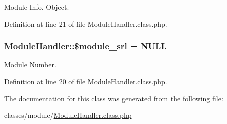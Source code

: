 Module Info. Object. 



Definition at line 21 of file Module\-Handler.\-class.\-php.

\hypertarget{classModuleHandler_ad79751537e64d7bfc7dc6fa4280043b0}{
\subsubsection[{\$module\-\_\-srl}]{\setlength{\rightskip}{0pt plus 5cm}Module\-Handler\-::\$module\-\_\-srl = N\-U\-L\-L}}\label{classModuleHandler_ad79751537e64d7bfc7dc6fa4280043b0}


Module Number. 



Definition at line 20 of file Module\-Handler.\-class.\-php.



The documentation for this class was generated from the following file\-:\begin{DoxyCompactItemize}
\item 
classes/module/\hyperlink{ModuleHandler_8class_8php}{Module\-Handler.\-class.\-php}\end{DoxyCompactItemize}
